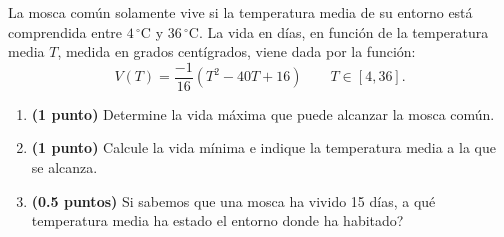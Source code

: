 
La mosca común solamente vive si la temperatura media de su entorno está comprendida entre $4\,{}^\circ\mathrm{C}$ y $36\,{}^\circ\mathrm{C}$. La vida en días, en función de la temperatura media $T$, medida en grados centígrados, viene dada por la función:
\[
V(T)=\frac{-1}{16}\left(T^2-40T+16\right)\qquad T\in[4,36].
\]
\begin{enumerate}[label=\alph*)]
\item \textbf{(1 punto)} Determine la vida máxima que puede alcanzar la mosca común.
\item \textbf{(1 punto)} Calcule la vida mínima e indique la temperatura media a la que se alcanza.
\item \textbf{(0.5 puntos)} Si sabemos que una mosca ha vivido 15 días, \textquestiondown{}a qué temperatura media ha estado el entorno donde ha habitado?
\end{enumerate}
